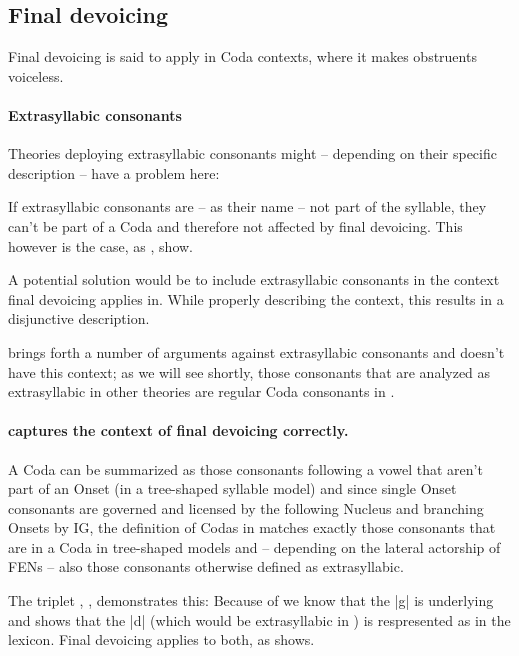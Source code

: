 \subsection{Final devoicing}

Final devoicing is said to apply in Coda contexts,
where it makes obstruents voiceless.

\paragraph{Extrasyllabic consonants}
Theories deploying extrasyllabic consonants might
-- depending on their specific description --
have a problem here:

If extrasyllabic consonants are -- as their name  --
not part of the syllable, they can't be part of a Coda
and therefore not affected by final devoicing.
This however  is the case,
as  \ti{[ma:kt]},  \ti{[ja:kt]} show.

A potential solution would be to include extrasyllabic
consonants in the context final devoicing applies in.
While properly describing the context, this results
in a disjunctive description.

\cite{scheer2004} brings forth a number of arguments
against extrasyllabic consonants and \CVCV doesn't
have this context; as we will see shortly, those
consonants that are analyzed as extrasyllabic in other
theories are regular Coda consonants in \CVCV.

\paragraph{\CVCV captures the context of final devoicing correctly.}
A Coda can be summarized as those consonants following
a vowel that aren't part of an Onset
(in a tree-shaped syllable model) and since single Onset
consonants are governed and licensed by the following
Nucleus and branching Onsets by \gls{IG},
the definition of Codas in \CVCV matches exactly those
consonants that are in a Coda in tree-shaped models
and -- depending on the lateral actorship of \glspl{FEN} --
also those consonants otherwise defined as extrasyllabic.

The triplet , , 
demonstrates this: Because of  we know
that the |g| is underlying and  shows
that the |d| (which would be extrasyllabic in )
is respresented as  in the lexicon.
Final devoicing applies to both, as \ti{[ja:kt]} shows.

